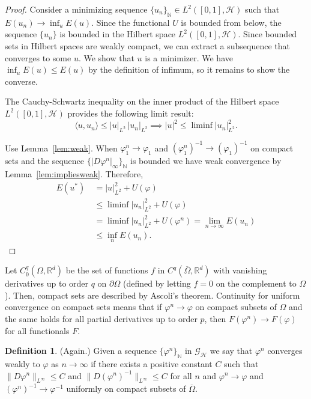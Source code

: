 \documentclass{article}
\theoremstyle{plain}
\theoremstyle{definition}
\newtheorem{defin}[teo]{Definition}
\numberwithin{equation}{section}
\newcommand{\N}{\ensuremath{\mathbb{N}}}
\newcommand{\R}{\ensuremath{\mathbb{R}}}
\begin{document}
\begin{proof}
Consider a minimizing sequence $\{u_n\}_\N \in L^2([0,1],\mathcal{H})$ such that $E(u_n)\to \inf_u E(u)$. Since the functional $U$ is bounded from below, the sequence $\{u_n\}$ is bounded in the Hilbert space $L^2([0,1],\mathcal{H})$. Since bounded sets in Hilbert spaces are weakly compact, we can extract a subsequence that converges to some $u$. We show that $u$ is a minimizer. We have $\inf_u E(u)\leq E(u)$ by the definition of infimum, so it remains to show the converse.

The Cauchy-Schwartz inequality on the inner product of the Hilbert space $L^2([0,1],\mathcal{H})$ provides the following limit result:
\[
\langle u,u_n\rangle\leq |u|_{L^2}\,|u_n|_{L^2} \implies |u|^2\leq \liminf |u_n|^2_{L^2}.
\]

Use Lemma~\ref{lem:weak}. 
When $\varphi_1^n\to \varphi_1$ and $(\varphi_1^n)^{-1}\to (\varphi_1)^{-1}$ on compact sets and the sequence $\{|D\varphi^n|_\infty\}_\N$ is bounded we have weak convergence by Lemma~\ref{lem:impliesweak}. 
Therefore,
\begin{align*}
E(u^*) \ &= |u|^2_{L^2} + U(\varphi)\\
&\leq \liminf |u_n|^2_{L^2} + U(\varphi)\\
&= \liminf |u_n|^2_{L^2} + U(\varphi^n) = \lim_{n\to\infty} E(u_n)\\
&\leq \inf_n E(u_n).
\end{align*} 
\end{proof}


Let $C_0^q(\Omega,\R^d)$ be the set of functions $f$ in $C^q(\overline{\Omega},\R^d)$ with vanishing derivatives up to order $q$ on $\partial\Omega$ (defined by letting $f=0$ on the complement to $\Omega$). Then, compact sets are described by Ascoli's theorem. Continuity for uniform convergence on compact sets means that if $\varphi^n\to\varphi$ on compact subsets of $\Omega$ and the same holds for all partial derivatives up to order $p$, then $F(\varphi^n)\to F(\varphi)$ for all functionals $F$.

\begin{defin} (Again.)
Given a sequence $\{\varphi^n\}_\N$ in $\mathcal{G}_\mathcal{H}$ we say that $\varphi^n$ converges weakly to $\varphi$ as $n\to\infty$ if there exists a positive constant $C$ such that $\|D\varphi^n\|_{L^\infty}\leq C$ and $\|D(\varphi^n)^{-1}\|_{L^\infty}\leq C$ for all $n$ and $\varphi^n\to\varphi$ and $(\varphi^n)^{-1}\to\varphi^{-1}$ uniformly on compact subsets of $\overline{\Omega}$.
\end{defin}
\end{document}
